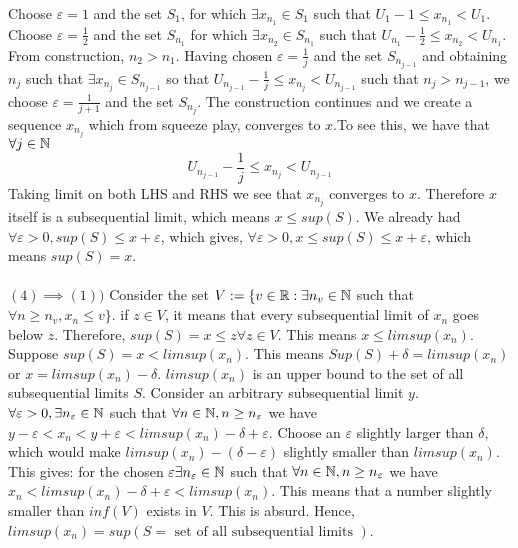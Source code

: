 \documentclass[../Main.tex]{subfiles}
\begin{document}
{Choose $\varepsilon=1$ and the set $S_1$, for which $\exists x_{n_1} \in S_1$ such that $U_1-1\leq x_{n_1}<U_1$. Choose $\varepsilon=\frac{1}{2}$ and the set $S_{n_1}$ for which $\exists x_{n_2} \in S_{n_1}$ such that $U_{n_1}-\frac{1}{2}\leq x_{n_2}<U_{n_1}$. From construction, $n_2>n_1$. Having chosen $\varepsilon=\frac{1}{j}$ and the set $S_{n_{j-1}}$ and obtaining $n_j$ such that $\exists x_{n_j} \in S_{n_{j-1}}$ so that $U_{n_{j-1}}-\frac{1}{j} \leq x_{n_j}<U_{n_{j-1}}$ such that $n_j>n_{j-1}$, we choose $\varepsilon=\frac{1}{j+1}$ and the set $S_{n_j}$. The construction continues and we create a sequence $x_{n_j}$ which from squeeze play, converges to $x$.To see this, we have that $\forall j \in \mathbb N$ $$U_{n_{j-1}}-\frac{1}{j} \leq x_{n_j}<U_{n_{j-1}}$$
Taking limit on both LHS and RHS we see that $x_{n_j}$ converges to $x$. Therefore $x$ itself is a subsequential limit, which means $x \leq sup(S)$. We already had $\forall \varepsilon>0, sup(S) \leq x+\varepsilon$, which gives, $\forall \varepsilon>0, x\leq sup(S) \leq x+ \varepsilon$, which means $sup(S)=x$.\\\\
$(4) \implies (1))$ Consider the set $V:=\{v \in \mathbb R: \exists n_v \in \mathbb N$ such that $ \forall n \geq n_v, x_n \leq v \}$. if $z \in V$, it means that every subsequential limit of $x_n$ goes below $z$. Therefore, $sup(S)=x \leq z \forall z\in V$. This means $x \leq limsup(x_n)$. Suppose $sup(S)=x<limsup(x_n)$. This means $Sup(S)+\delta=limsup(x_n)$ or $x=limsup(x_n)-\delta$. $limsup(x_n)$ is an upper bound to the set of all subsequential limits $S$. Consider an arbitrary subsequential limit $y$. $\forall \varepsilon>0, \exists n_{\varepsilon} \in \mathbb N$ such that $\forall n \in \mathbb N, n \geq n_{\varepsilon}$ we have $y-\varepsilon<x_n<y+\varepsilon<limsup(x_n)-\delta+\varepsilon$. Choose an $\varepsilon$ slightly larger than $\delta$, which would make $limsup(x_n)-(\delta-\varepsilon)$ slightly smaller than $limsup(x_n)$. This gives: for the chosen $\varepsilon \exists n_{\varepsilon} \in \mathbb N$ such that $\forall n \in \mathbb N, n \geq n_{\varepsilon}$ we have $x_n<limsup(x_n)-\delta+\varepsilon<limsup(x_n)$. This means that a number slightly smaller than $inf(V)$ exists in $V$. This is absurd. Hence, $limsup(x_n)=sup(S=\text{ set of all subsequential limits })$.
}
\end{document}
